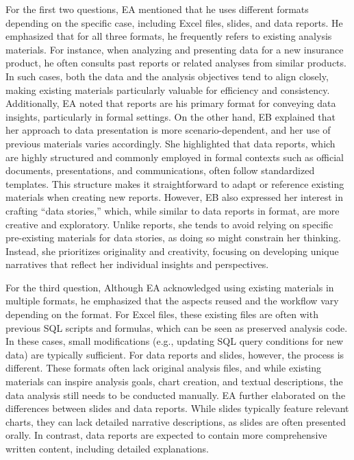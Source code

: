 For the first two questions, EA mentioned that he uses different formats depending on the specific case, including Excel files, slides, and data reports. He emphasized that for all three formats, he frequently refers to existing analysis materials. For instance, when analyzing and presenting data for a new insurance product, he often consults past reports or related analyses from similar products. In such cases, both the data and the analysis objectives tend to align closely, making existing materials particularly valuable for efficiency and consistency. Additionally, EA noted that reports are his primary format for conveying data insights, particularly in formal settings.
On the other hand, EB explained that her approach to data presentation is more scenario-dependent, and her use of previous materials varies accordingly. She highlighted that data reports, which are highly structured and commonly employed in formal contexts such as official documents, presentations, and communications, often follow standardized templates. This structure makes it straightforward to adapt or reference existing materials when creating new reports.
However, EB also expressed her interest in crafting ``data stories,'' which, while similar to data reports in format, are more creative and exploratory. Unlike reports, she tends to avoid relying on specific pre-existing materials for data stories, as doing so might constrain her thinking. Instead, she prioritizes originality and creativity, focusing on developing unique narratives that reflect her individual insights and perspectives.


For the third question, Although EA acknowledged using existing materials in multiple formats, he emphasized that the aspects reused and the workflow vary depending on the format. 
For Excel files, these existing files are often with previous SQL scripts and formulas, which can be seen as preserved analysis code. 
In these cases, small modifications (e.g., updating SQL query conditions for new data) are typically sufficient. 
For data reports and slides, however, the process is different. 
These formats often lack original analysis files, and while existing materials can inspire analysis goals, chart creation, and textual descriptions, the data analysis still needs to be conducted manually.
EA further elaborated on the differences between slides and data reports. 
While slides typically feature relevant charts, they can lack detailed narrative descriptions, as slides are often presented orally. 
In contrast, data reports are expected to contain more comprehensive written content, including detailed explanations.


